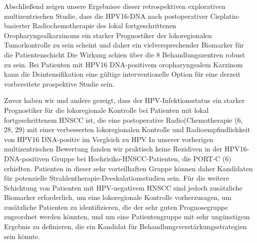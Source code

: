 Abschließend zeigen unsere Ergebnisse dieser retrospektiven explorativen multizentrischen Studie, dass die HPV16-DNA nach postoperativer Cisplatin-basierter Radiochemotherapie des lokal fortgeschrittenen Oropharyngealkarzinoms ein starker Prognostiker der lokoregionalen Tumorkontrolle zu sein scheint und daher ein vielversprechender Biomarker für die Patientenschicht Die Wirkung schien über die 8 Behandlungszentren robust zu sein. Bei Patienten mit HPV16 DNA-positivem oropharyngealem Karzinom kann die Deintensifikation eine gültige interventionelle Option für eine derzeit vorbereitete prospektive Studie sein.

Zuvor haben wir und andere gezeigt, dass der HPV-Infektionsstatus ein starker Prognostiker für die lokoregionale Kontrolle bei Patienten mit lokal fortgeschrittenem HNSCC ist, die eine postoperative Radio(Chemotherapie (6, 28, 29) mit einer verbesserten lokoregionalen Kontrolle und Radioempfindlichkeit von HPV16 DNA-positiv im Vergleich zu HPV In unserer vorherigen multizentrischen Bewertung fanden wir praktisch keine Rezidiven in der HPV16-DNA-positiven Gruppe bei Hochrisiko-HNSCC-Patienten, die PORT-C (6) erhielten. Patienten in dieser sehr vorteilhaften Gruppe können daher Kandidaten für potenzielle Strahlentherapie-Deeskalationsstudien sein. Für die weitere Schichtung von Patienten mit HPV-negativem HNSCC sind jedoch zusätzliche Biomarker erforderlich, um eine lokoregionale Kontrolle vorherzusagen, um zusätzliche Patienten zu identifizieren, die der sehr guten Prognosegruppe zugeordnet werden könnten, und um eine Patientengruppe mit sehr ungünstigem Ergebnis zu definieren, die ein Kandidat für Behandlungsverstärkungsstrategien sein könnte.

